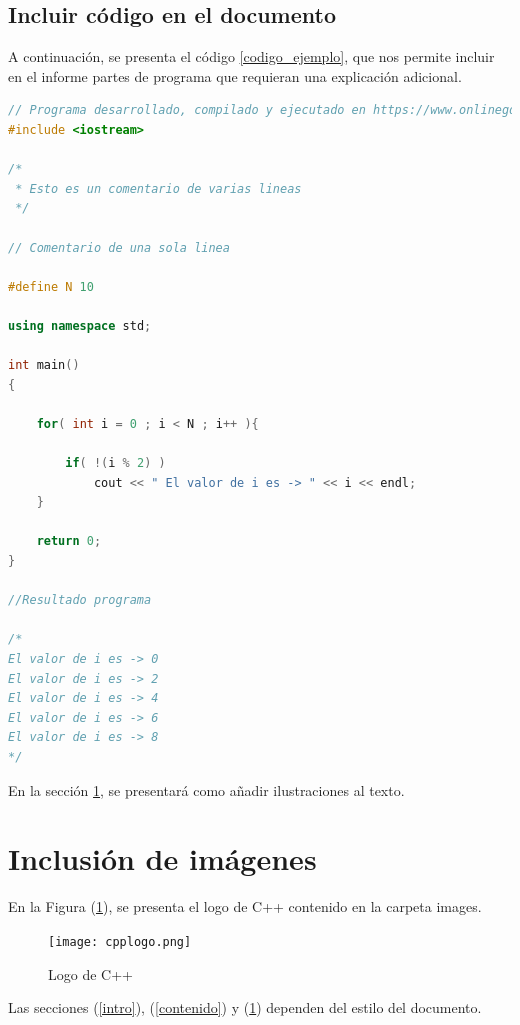 \documentclass{article}
\begin{document}
\subsection{Incluir código en el documento}
%
A continuación, se presenta el código \ref{codigo_ejemplo}, que nos permite incluir en el informe partes de programa que requieran una explicación adicional.
\begin{lstlisting}[language=C++, label=codigo_ejemplo]
// Programa desarrollado, compilado y ejecutado en https://www.onlinegdb.com
#include <iostream>

/*
 * Esto es un comentario de varias lineas
 */

// Comentario de una sola linea

#define N 10

using namespace std;

int main()
{
    
    for( int i = 0 ; i < N ; i++ ){
        
        if( !(i % 2) )
            cout << " El valor de i es -> " << i << endl;
    }
    
    return 0;
}

//Resultado programa

/*
El valor de i es -> 0
El valor de i es -> 2
El valor de i es -> 4
El valor de i es -> 6
El valor de i es -> 8
*/
\end{lstlisting}
En la sección \ref{imagenes}, se presentará como añadir ilustraciones al texto.

\section{Inclusión de imágenes} \label{imagenes}

En la Figura (\ref{fig:cpplogo}), se presenta el logo de C++ contenido en la carpeta images.

\begin{figure}[h]
\texttt{[image: cpplogo.png]}
\centering
\caption{Logo de C++}
\label{fig:cpplogo}
\end{figure}

Las secciones (\ref{intro}), (\ref{contenido}) y (\ref{imagenes}) dependen del estilo del documento.



\end{document}
